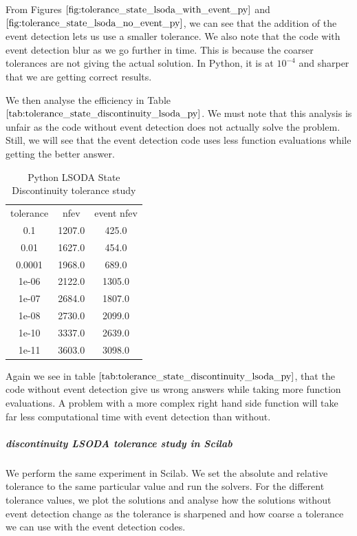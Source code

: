 From Figures $\ref{fig:tolerance_state_lsoda_with_event_py}$ and $\ref{fig:tolerance_state_lsoda_no_event_py}$, we can see that the addition of the event detection lets us use a smaller tolerance. We also note that the code with event detection blur as we go further in time. This is because the coarser tolerances are not giving the actual solution. In Python, it is at $10^{-4}$ and sharper that we are getting correct results. 

We then analyse the efficiency in Table $\ref{tab:tolerance_state_discontinuity_lsoda_py}$. We must note that this analysis is unfair as the code without event detection does not actually solve the problem. Still, we will see that the event detection code uses less function evaluations while getting the better answer.

\begin{table}[h]
\caption {Python LSODA State Discontinuity tolerance study} \label{tab:tolerance_state_discontinuity_lsoda_py} 
\begin{center}
\begin{tabular}{ c c c }
tolerance & nfev & event nfev \\ 
0.1    & 1207.0 & 425.0  \\
0.01   & 1627.0 & 454.0  \\
0.0001 & 1968.0 & 689.0  \\
1e-06  & 2122.0 & 1305.0 \\
1e-07  & 2684.0 & 1807.0 \\
1e-08  & 2730.0 & 2099.0 \\
1e-10  & 3337.0 & 2639.0 \\
1e-11  & 3603.0 & 3098.0 \\
\end{tabular}
\end{center}
\end{table}

Again we see in table $\ref{tab:tolerance_state_discontinuity_lsoda_py}$, that the code without event detection give us wrong answers while taking more function evaluations. A problem with a more complex right hand side function will take far less computational time with event detection than without.

\subparagraph{discontinuity LSODA tolerance study in Scilab}

We perform the same experiment in Scilab. We set the absolute and relative tolerance to the same particular value and run the solvers. For the different tolerance values, we plot the solutions and analyse how the solutions without event detection change as the tolerance is sharpened and how coarse a tolerance we can use with the event detection codes.

